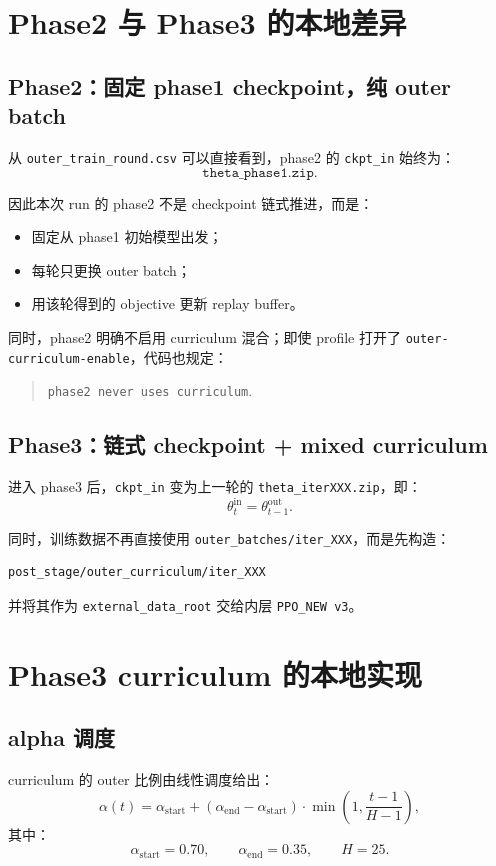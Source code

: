 \documentclass[11pt,a4paper]{ctexart}
\begin{document}
\section{Phase2 与 Phase3 的本地差异}

\subsection{Phase2：固定 phase1 checkpoint，纯 outer batch}
从 \texttt{outer\_train\_round.csv} 可以直接看到，phase2 的 \texttt{ckpt\_in} 始终为：
\[
\texttt{theta\_phase1.zip}.
\]

因此本次 run 的 phase2 不是 checkpoint 链式推进，而是：
\begin{itemize}[leftmargin=2.2em,itemsep=0.2em]
    \item 固定从 phase1 初始模型出发；
    \item 每轮只更换 outer batch；
    \item 用该轮得到的 objective 更新 replay buffer。
\end{itemize}

同时，phase2 明确不启用 curriculum 混合；即使 profile 打开了 \texttt{outer-curriculum-enable}，代码也规定：
\begin{quote}
\texttt{phase2 never uses curriculum}.
\end{quote}

\subsection{Phase3：链式 checkpoint + mixed curriculum}
进入 phase3 后，\texttt{ckpt\_in} 变为上一轮的 \texttt{theta\_iterXXX.zip}，即：
\[
\theta_{t}^{\text{in}} = \theta_{t-1}^{\text{out}}.
\]

同时，训练数据不再直接使用 \texttt{outer\_batches/iter\_XXX}，而是先构造：
\begin{lstlisting}
post_stage/outer_curriculum/iter_XXX
\end{lstlisting}
并将其作为 \texttt{external\_data\_root} 交给内层 \texttt{PPO\_NEW v3}。

\section{Phase3 curriculum 的本地实现}

\subsection{alpha 调度}
curriculum 的 outer 比例由线性调度给出：
\[
\alpha(t)=\alpha_{\text{start}} + (\alpha_{\text{end}}-\alpha_{\text{start}})
\cdot \min\!\left(1,\frac{t-1}{H-1}\right),
\]
其中：
\[
\alpha_{\text{start}}=0.70,\qquad
\alpha_{\text{end}}=0.35,\qquad
H=25.
\]
\end{document}
